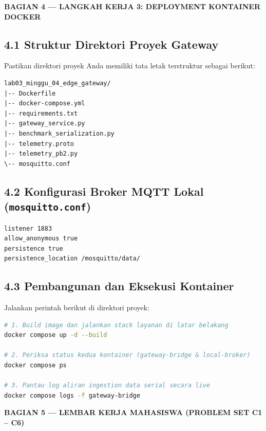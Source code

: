 \documentclass[11pt,a4paper]{article}
\newcommand{\secbanner}[2]{%
    \vspace{8pt}%
    \noindent\colorbox{unibnavy}{%
        \parbox{\dimexpr\textwidth-2\fboxsep\relax}{%
            \vspace{4pt}\textbf{\large\color{white}#1 --- #2}\vspace{4pt}%
        }%
    }%
    \vspace{4pt}%
}
\begin{document}
\secbanner{BAGIAN 4}{LANGKAH KERJA 3: DEPLOYMENT KONTAINER DOCKER}

\subsection*{4.1 Struktur Direktori Proyek Gateway}
Pastikan direktori proyek Anda memiliki tata letak terstruktur sebagai berikut:
\begin{lstlisting}[style=labcode]
lab03_minggu_04_edge_gateway/
|-- Dockerfile
|-- docker-compose.yml
|-- requirements.txt
|-- gateway_service.py
|-- benchmark_serialization.py
|-- telemetry.proto
|-- telemetry_pb2.py
\-- mosquitto.conf
\end{lstlisting}

\subsection*{4.2 Konfigurasi Broker MQTT Lokal (\texttt{mosquitto.conf})}
\begin{lstlisting}[style=labcode]
listener 1883
allow_anonymous true
persistence true
persistence_location /mosquitto/data/
\end{lstlisting}

\subsection*{4.3 Pembangunan dan Eksekusi Kontainer}
Jalankan perintah berikut di direktori proyek:
\begin{lstlisting}[style=labcode, language=bash]
# 1. Build image dan jalankan stack layanan di latar belakang
docker compose up -d --build

# 2. Periksa status kedua kontainer (gateway-bridge & local-broker)
docker compose ps

# 3. Pantau log aliran ingestion data serial secara live
docker compose logs -f gateway-bridge
\end{lstlisting}

\secbanner{BAGIAN 5}{LEMBAR KERJA MAHASISWA (PROBLEM SET C1 -- C6)}
\end{document}
